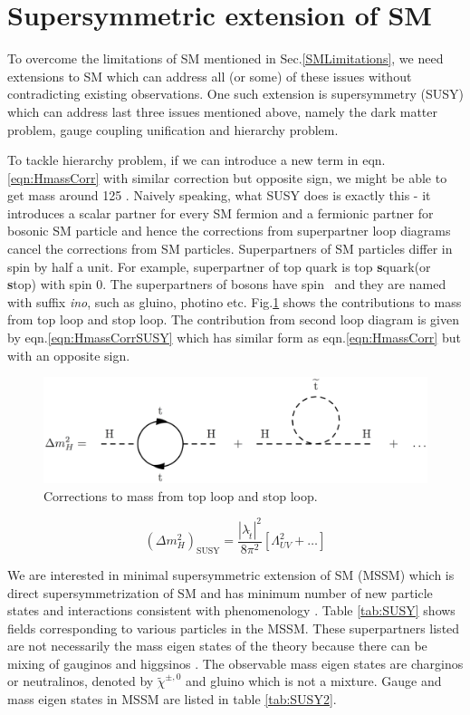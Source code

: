 \section{Supersymmetric extension of SM}
To overcome the limitations of SM mentioned in Sec.\ref{SMLimitations}, we need extensions to SM which can address all (or some) of these issues without contradicting existing observations. One such extension is supersymmetry (SUSY) which can address last three issues mentioned above, namely the dark matter problem, gauge coupling unification and hierarchy problem.

To tackle hierarchy problem, if we can introduce a new term in eqn.\ref{eqn:HmassCorr} with similar correction but opposite sign, we might be able to get \higgs mass around 125 \gev. Naively speaking, what SUSY does is exactly this - it introduces a scalar partner for every SM fermion and a fermionic partner for bosonic SM particle and hence the corrections from superpartner loop diagrams cancel the corrections from SM particles. Superpartners of SM particles differ in spin by half a unit. For example, superpartner of top quark is top \textbf{s}quark(or \textbf{s}top) with spin 0. The superpartners of bosons have spin \textonehalf\ and they are named with suffix \textit{ino}, such as gluino, photino etc. Fig.\ref{fig:hierarchy_problem_higgs_mass_stop} shows the contributions to \higgs mass from top loop and stop loop. The contribution from second loop diagram is given by eqn.\ref{eqn:HmassCorrSUSY} which has similar form as eqn.\ref{eqn:HmassCorr} but with an opposite sign.
\begin{figure}[h!]
\centering
\includegraphics[width=0.8\linewidth]{../Figures/Chap1/hierarchy_problem_higgs_mass_stop}
\caption{Corrections to \higgs mass from top loop and stop loop.}
\label{fig:hierarchy_problem_higgs_mass_stop}
\end{figure}
\begin{equation}
(\Delta m_{H}^2)_{\text{SUSY}} = \frac{|\lambda_{\tilde{t}}|^2}{8\pi^2}[\Lambda_{UV}^2 + \dots]
\label{eqn:HmassCorrSUSY}
\end{equation}

We are interested in minimal supersymmetric extension of SM (MSSM) which is direct supersymmetrization of SM and has minimum number of new particle states and interactions consistent with phenomenology \cite{baer_tata_2006}. Table \ref{tab:SUSY} shows fields corresponding to various particles in the MSSM. These superpartners listed are not necessarily the mass eigen states of the theory because there can be mixing of gauginos and higgsinos \cite{Martin:1997ns}. The observable mass eigen states are charginos or neutralinos, denoted by $\tilde{\chi}^{\pm,0}$ and gluino which is not a mixture. Gauge and mass eigen states in MSSM are listed in table \ref{tab:SUSY2}.

